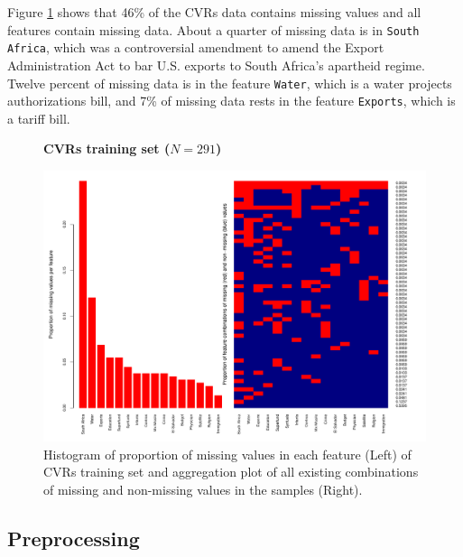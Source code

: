 \documentclass[10pt,twocolumn,letterpaper]{article}
\begin{document}
Figure \ref{fig:proportion-missing-votes} shows that 46\% of the CVRs data contains missing values and all features contain missing data. About a quarter of missing data is in \texttt{South Africa}, which was a controversial amendment to amend the Export Administration Act to bar U.S. exports to South Africa's apartheid regime. Twelve percent of missing data is in the feature \texttt{Water}, which is a water projects authorizations bill, and 7\% of missing data rests in the feature \texttt{Exports}, which is a tariff bill. 

\begin{figure}[htbp] 
   \begin{center}
      \textbf{CVRs training set ($N=291$)}\par\medskip
   \includegraphics[scale=0.5]{figure/proportion-missing-votes.pdf}
  \caption{Histogram of proportion of missing values in each feature (Left) of CVRs training set and aggregation plot of all existing combinations of missing and non-missing values in the samples (Right).}
   \label{fig:proportion-missing-votes}
      \end{center}
\end{figure}

\subsection{Preprocessing}
\end{document}
